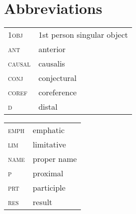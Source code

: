 \documentclass[output=paper]{langscibook}
\begin{document}
\section*{Abbreviations}
\begin{tabularx}{.45\textwidth}{lL{4cm}}
\textsc{1obj} & 1st person singular object\\
\textsc{ant} &anterior\\
\textsc{causal} & causalis\\
\textsc{conj} & conjectural\\
\textsc{coref} & coreference\\
\textsc{d} & distal\\
\end{tabularx}
\begin{tabularx}{.45\textwidth}{lL{4cm}}
\textsc{emph} & emphatic\\
\textsc{lim} & limitative\\
\textsc{name} & proper name\\
\textsc{p} & proximal\\
\textsc{prt} & participle\\
\textsc{res} & result\\
\end{tabularx}


\sloppy
\printbibliography[heading=subbibliography,notkeyword=this]
\end{document}
